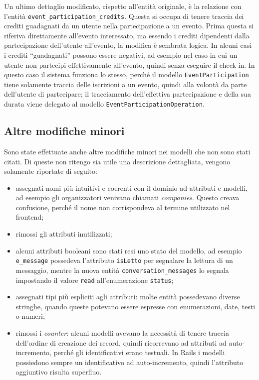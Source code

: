 Un ultimo dettaglio modificato, rispetto all'entità originale, è la relazione con l'entità \verb|event_participation_credits|. Questa si occupa di tenere traccia dei crediti guadagnati da un utente nella partecipazione a un evento. Prima questa si riferiva direttamente all'evento interessato, ma essendo i crediti dipendenti dalla partecipazione dell'utente all'evento, la modifica è sembrata logica. In alcuni casi i crediti ``guadagnati'' possono essere negativi, ad esempio nel caso in cui un utente non partecipi effettivamente all'evento, quindi senza eseguire il check-in. In questo caso il sistema funziona lo stesso, perché il modello \verb|EventParticipation| tiene solamente traccia delle iscrizioni a un evento, quindi alla volontà da parte dell'utente di partecipare; il tracciamento dell'effettiva partecipazione e della sua durata viene delegato al modello \verb|EventParticipationOperation|.


\subsection{Altre modifiche minori}
Sono state effettuate anche altre modifiche minori nei modelli che non sono stati citati. Di queste non ritengo sia utile una descrizione dettagliata, vengono solamente riportate di seguito:
\begin{itemize}
	\item assegnati nomi più intuitivi e coerenti con il dominio ad attributi e modelli, ad esempio gli organizzatori venivano chiamati \emph{companies}. Questo creava confusione, perché il nome non corrispondeva al termine utilizzato nel frontend;
	\item rimossi gli attributi inutilizzati;
	\item alcuni attributi booleani sono stati resi uno stato del modello, ad esempio \verb|e_message| possedeva l'attributo \verb|isLetto| per segnalare la lettura di un messaggio, mentre la nuova entità \verb|conversation_messages| lo segnala impostando il valore \verb|read| all'enumerazione \verb|status|;
	\item assegnati tipi più espliciti agli attributi: molte entità possedevano diverse stringhe, quando queste potevano essere espresse con enumerazioni, date, testi o numeri;
	\item rimossi i \emph{counter}: alcuni modelli avevano la necessità di tenere traccia dell'ordine di creazione dei record, quindi ricorrevano ad attributi ad auto-incremento, perché gli identificativi erano testuali. In Rails i modelli possiedono sempre un identificativo ad auto-incremento, quindi l'attributo aggiuntivo risulta superfluo.
\end{itemize}
